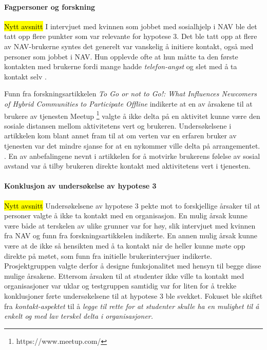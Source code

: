 \paragraph{Fagpersoner og forskning}
\hl{Nytt avsnitt}
I intervjuet med kvinnen som jobbet med sosialhjelp i NAV ble det tatt opp flere punkter som var relevante for hypotese 3. Det ble tatt opp at flere av NAV-brukerne syntes det generelt var vanskelig å initiere kontakt, også med personer som jobbet i NAV. Hun opplevde ofte at hun måtte ta den første kontakten med brukerne fordi mange hadde {\em telefon-angst} og slet med å ta kontakt selv \cite{NAV-INTERVJU:16}.

Funn fra forskningsartikkelen {\em To Go or not to Go!: What Influences Newcomers of Hybrid Communities to Participate Offline} indikerte at en av årsakene til at brukere av tjenesten Meetup \footnote{https://www.meetup.com/} valgte å ikke delta på en aktivitet kunne være den sosiale distansen mellom aktivitetens vert og brukeren. Undersøkelsene i artikkelen kom blant annet fram til at om verten var en erfaren bruker av tjenesten var det mindre sjanse for at en nykommer ville delta på arrangementet. . En av anbefalingene nevnt i artikkelen for å motvirke brukerens følelse av sosial avstand var å tilby brukeren direkte kontakt med aktivitetens vert i tjenesten. \cite{NEWCOMERS:4:CT17}

\paragraph{Konklusjon av undersøkelse av hypotese 3}
\hl{Nytt avsnitt}
Undersøkelsene av hypotese 3 pekte mot to forskjellige årsaker til at personer valgte å ikke ta kontakt med en organisasjon. En mulig årsak kunne være både at terskelen av ulike grunner var for høy, slik intervjuet med kvinnen fra NAV og funn fra forskningsartikkelen indikerte. En annen mulig årsak kunne være at de ikke så hensikten med å ta kontakt når de heller kunne møte opp direkte på møtet, som funn fra initielle brukerintervjuer indikerte. Prosjektgruppen valgte derfor å designe funksjonalitet med hensyn til begge disse mulige årsakene. Ettersom årsaken til at studenter ikke ville ta kontakt med organisasjoner var uklar og testgruppen samtidig var for liten for å trekke konklusjoner førte undersøkelsene til at hypotese 3 ble svekket. Fokuset ble skiftet fra {\em kontakt-aspektet} til å {\em legge til rette for at studenter skulle ha en mulighet til å enkelt og med lav terskel delta i organisasjoner.}



